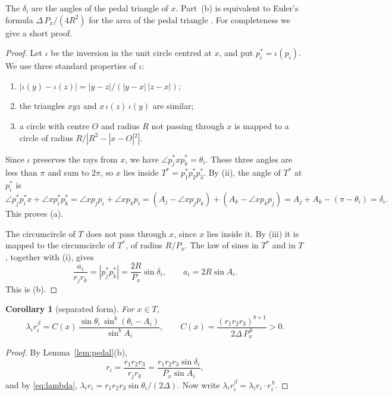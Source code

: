 \documentclass[11pt]{amsart}
\newtheorem{corollary}[theorem]{Corollary}
\theoremstyle{remark}
\begin{document}
The $\delta_i$ are the angles of the pedal triangle of $x$. Part~(b) is equivalent to Euler's formula
$\Delta\,P_x/(4R^2)$ for the area of the pedal triangle \cite{Johnson}. For completeness we give a short proof.

\begin{proof}
Let $\iota$ be the inversion in the unit circle centred at $x$, and put $p_i^*=\iota(p_i)$. We use three standard
properties of $\iota$:
\begin{enumerate}
\item[(i)] $|\iota(y)-\iota(z)|=|y-z|/(|y-x|\,|z-x|)$;
\item[(ii)] the triangles $xyz$ and $x\,\iota(z)\,\iota(y)$ are similar;
\item[(iii)] a circle with centre $O$ and radius $R$ not passing through $x$ is mapped to a circle of radius
  $R/|R^2-|x-O|^2|$.
\end{enumerate}

Since $\iota$ preserves the rays from $x$, we have $\angle p_j^*xp_k^*=\theta_i$. These three angles are less than $\pi$
and sum to $2\pi$, so $x$ lies inside $T^*=p_1^*p_2^*p_3^*$. By (ii), the angle of $T^*$ at $p_i^*$ is
\[
  \angle p_j^*p_i^*x+\angle xp_i^*p_k^*=\angle xp_jp_i+\angle xp_kp_i
  =(A_j-\angle xp_jp_k)+(A_k-\angle xp_kp_j)=A_j+A_k-(\pi-\theta_i)=\delta_i .
\]
This proves (a).

The circumcircle of $T$ does not pass through $x$, since $x$ lies inside it. By (iii) it is mapped to the circumcircle
of $T^*$, of radius $R/P_x$. The law of sines in $T^*$ and in $T$, together with (i), gives
\[
  \frac{a_i}{r_jr_k}=|p_j^*p_k^*|=\frac{2R}{P_x}\sin\delta_i,
  \qquad a_i=2R\sin A_i .
\]
This is (b).
\end{proof}

\begin{corollary}[separated form]\label{cor:sep}
For $x\in T$,
\begin{equation}\label{eq:sep}
  \lambda_ir_i^\beta=C(x)\,\frac{\sin\theta_i\,\sin^b(\theta_i-A_i)}{\sin^bA_i},
  \qquad C(x)=\frac{(r_1r_2r_3)^{b+1}}{2\Delta\,P_x^{\,b}}>0 .
\end{equation}
\end{corollary}

\begin{proof}
By Lemma~\ref{lem:pedal}(b),
\[
  r_i=\frac{r_1r_2r_3}{r_jr_k}=\frac{r_1r_2r_3\sin\delta_i}{P_x\sin A_i},
\]
and by \eqref{eq:lambda}, $\lambda_ir_i=r_1r_2r_3\sin\theta_i/(2\Delta)$. Now write
$\lambda_ir_i^\beta=\lambda_ir_i\cdot r_i^{\,b}$.
\end{proof}
\end{document}
